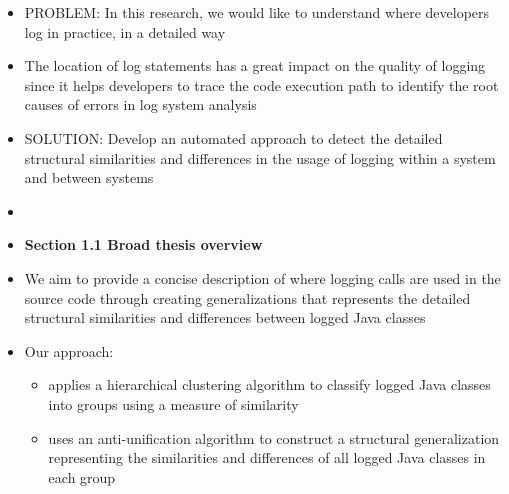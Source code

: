 \documentclass{article}
\newcommand{\bold}{\textbf}
\newcommand{\tsc}{\textsc}
\begin{document}
\begin{itemize} [leftmargin=.1in]
\item \tsc{PROBLEM: }In this research, we would like to understand
where developers log in practice, in a detailed way

\item The location of log statements has a great impact on the quality of logging since it helps developers to trace the code execution path to identify the root causes of errors in log system analysis
\item \tsc{SOLUTION: }Develop an automated approach to detect the detailed structural similarities and differences in the usage of logging within a system and between systems

\item {} 


\item \bold{Section 1.1 Broad thesis overview}
\item We aim to provide a concise description of where logging calls are used in the source code through creating generalizations that represents the detailed structural similarities and differences between logged Java classes

\item{Our approach:}
\begin{itemize}
\item applies a hierarchical clustering algorithm to classify logged Java classes into groups using a measure of similarity
\item uses an anti-unification algorithm to construct a structural generalization representing the similarities and differences of all logged Java classes in each group
\end{itemize}


\end{itemize}
\end{document}
